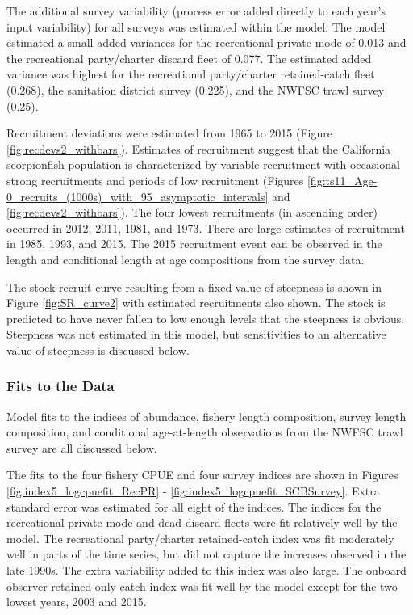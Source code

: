 \documentclass[12pt,]{article}
\begin{document}
The additional survey variability (process error added directly to each
year's input variability) for all surveys was estimated within the
model. The model estimated a small added variances for the recreational
private mode of 0.013 and the recreational party/charter discard fleet
of 0.077. The estimated added variance was highest for the recreational
party/charter retained-catch fleet (0.268), the sanitation district
survey (0.225), and the NWFSC trawl survey (0.25).

Recruitment deviations were estimated from 1965 to 2015 (Figure
\ref{fig:recdevs2_withbars}). Estimates of recruitment suggest that the
California scorpionfish population is characterized by variable
recruitment with occasional strong recruitments and periods of low
recruitment (Figures
\ref{fig:ts11_Age-0_recruits_(1000s)_with_95_asymptotic_intervals} and
\ref{fig:recdevs2_withbars}). The four lowest recruitments (in ascending
order) occurred in 2012, 2011, 1981, and 1973. There are large estimates
of recruitment in 1985, 1993, and 2015. The 2015 recruitment event can
be observed in the length and conditional length at age compositions
from the survey data.

The stock-recruit curve resulting from a fixed value of steepness is
shown in Figure \ref{fig:SR_curve2} with estimated recruitments also
shown. The stock is predicted to have never fallen to low enough levels
that the steepness is obvious. Steepness was not estimated in this
model, but sensitivities to an alternative value of steepness is
discussed below.

\subsubsection{Fits to the Data}\label{fits-to-the-data}

Model fits to the indices of abundance, fishery length composition,
survey length composition, and conditional age-at-length observations
from the NWFSC trawl survey are all discussed below.

The fits to the four fishery CPUE and four survey indices are shown in
Figures \ref{fig:index5_logcpuefit_RecPR} -
\ref{fig:index5_logcpuefit_SCBSurvey}. Extra standard error was
estimated for all eight of the indices. The indices for the recreational
private mode and dead-discard fleets were fit relatively well by the
model. The recreational party/charter retained-catch index was fit
moderately well in parts of the time series, but did not capture the
increases observed in the late 1990s. The extra variability added to
this index was also large. The onboard observer retained-only catch
index was fit well by the model except for the two lowest years, 2003
and 2015.
\end{document}
